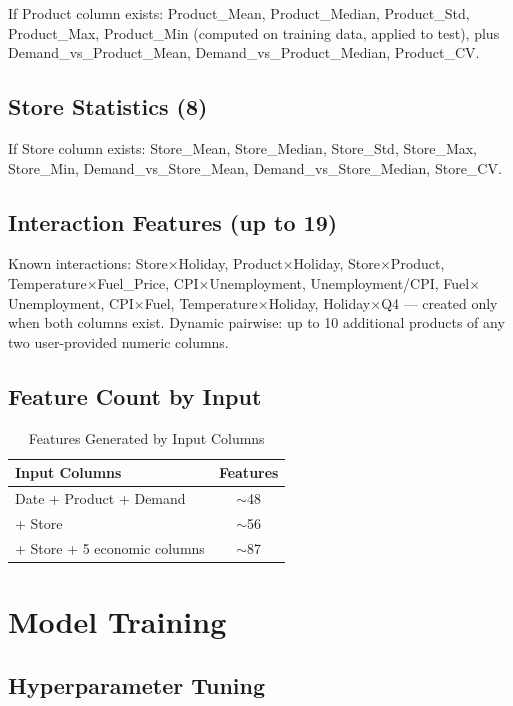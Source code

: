 \documentclass[conference]{IEEEtran}
\begin{document}
If Product column exists: Product\_Mean, Product\_Median, Product\_Std, Product\_Max, Product\_Min (computed on training data, applied to test), plus Demand\_vs\_Product\_Mean, Demand\_vs\_Product\_Median, Product\_CV.

\subsection{Store Statistics (8)}

If Store column exists: Store\_Mean, Store\_Median, Store\_Std, Store\_Max, Store\_Min, Demand\_vs\_Store\_Mean, Demand\_vs\_Store\_Median, Store\_CV.

\subsection{Interaction Features (up to 19)}

Known interactions: Store$\times$Holiday, Product$\times$Holiday, Store$\times$Product, Temperature$\times$Fuel\_Price, CPI$\times$Unemployment, Unemployment/CPI, Fuel$\times$Unemployment, CPI$\times$Fuel, Temperature$\times$Holiday, Holiday$\times$Q4 — created only when both columns exist. Dynamic pairwise: up to 10 additional products of any two user-provided numeric columns.

\subsection{Feature Count by Input}

\begin{table}[htbp]
\caption{Features Generated by Input Columns}
\centering
\begin{tabular}{|l|c|}
\hline
\textbf{Input Columns} & \textbf{Features} \\
\hline
Date + Product + Demand & $\sim$48 \\
+ Store & $\sim$56 \\
+ Store + 5 economic columns & $\sim$87 \\
\hline
\end{tabular}
\label{tab:features}
\end{table}

\section{Model Training}

\subsection{Hyperparameter Tuning}
\end{document}

